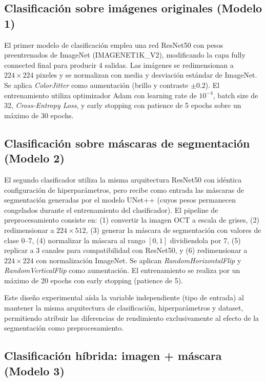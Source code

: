 \documentclass[journal, twocolumn]{IEEEtran}
\begin{document}
\subsection{Clasificación sobre imágenes originales (Modelo 1)}

El primer modelo de clasificación emplea una red ResNet50 \cite{he2016deep} con pesos preentrenados de ImageNet (IMAGENET1K\_V2), modificando la capa fully connected final para producir 4 salidas. Las imágenes se redimensionan a $224 \times 224$ pixeles y se normalizan con media y desviación estándar de ImageNet. Se aplica \textit{ColorJitter} como aumentación (brillo y contraste $\pm 0.2$). El entrenamiento utiliza optimizador Adam con learning rate de $10^{-4}$, batch size de 32, \textit{Cross-Entropy Loss}, y early stopping con patience de 5 epochs sobre un máximo de 30 epochs.

\subsection{Clasificación sobre máscaras de segmentación (Modelo 2)}

El segundo clasificador utiliza la misma arquitectura ResNet50 con idéntica configuración de hiperparámetros, pero recibe como entrada las máscaras de segmentación generadas por el modelo UNet++ (cuyos pesos permanecen congelados durante el entrenamiento del clasificador). El pipeline de preprocesamiento consiste en: (1) convertir la imagen OCT a escala de grises, (2) redimensionar a $224 \times 512$, (3) generar la máscara de segmentación con valores de clase 0--7, (4) normalizar la máscara al rango $[0, 1]$ dividiendola por 7, (5) replicar a 3 canales para compatibilidad con ResNet50, y (6) redimensionar a $224 \times 224$ con normalización ImageNet. Se aplican \textit{RandomHorizontalFlip} y \textit{RandomVerticalFlip} como aumentación. El entrenamiento se realiza por un máximo de 20 epochs con early stopping (patience de 5).

Este diseño experimental aísla la variable independiente (tipo de entrada) al mantener la misma arquitectura de clasificación, hiperparámetros y dataset, permitiendo atribuir las diferencias de rendimiento exclusivamente al efecto de la segmentación como preprocesamiento.

\subsection{Clasificación híbrida: imagen + máscara (Modelo 3)}
\end{document}
